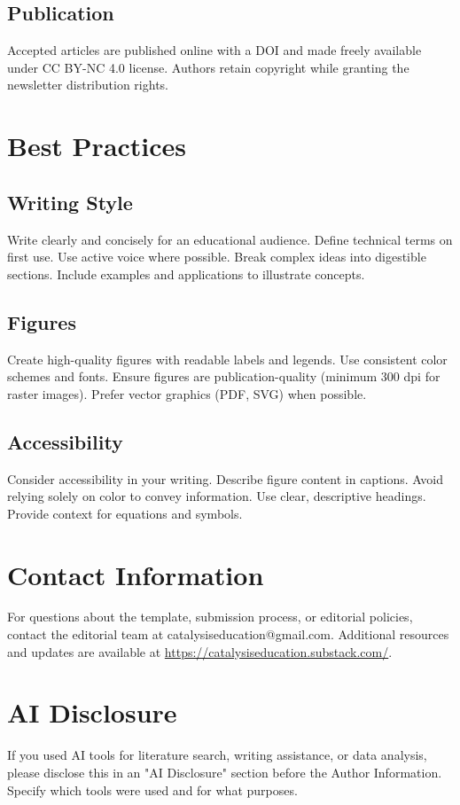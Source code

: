 \documentclass[10pt, a4paper]{article}
\begin{document}
	\subsection{Publication} Accepted articles are published online with a DOI and made freely available under CC BY-NC 4.0 license. Authors retain copyright while granting the newsletter distribution rights.
	
	\section{Best Practices}
	
	\subsection{Writing Style} Write clearly and concisely for an educational audience. Define technical terms on first use. Use active voice where possible. Break complex ideas into digestible sections. Include examples and applications to illustrate concepts.
	
	\subsection{Figures} Create high-quality figures with readable labels and legends. Use consistent color schemes and fonts. Ensure figures are publication-quality (minimum 300 dpi for raster images). Prefer vector graphics (PDF, SVG) when possible.
	
	\subsection{Accessibility} Consider accessibility in your writing. Describe figure content in captions. Avoid relying solely on color to convey information. Use clear, descriptive headings. Provide context for equations and symbols.
	
	\section{Contact Information}
	
	For questions about the template, submission process, or editorial policies, contact the editorial team at catalysiseducation@gmail.com. Additional resources and updates are available at \url{https://catalysiseducation.substack.com/}.
	
	\section*{AI Disclosure}
	If you used AI tools for literature search, writing assistance, or data analysis, please disclose this in an "AI Disclosure" section before the Author Information. Specify which tools were used and for what purposes.
	
\end{document}
